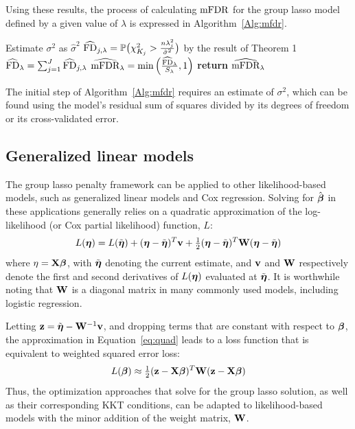 Using these results, the process of calculating $\textrm{mFDR}$ for the group lasso model defined by a given value of $\lambda$ is expressed in Algorithm~\ref{Alg:mfdr}.

\begin{algorithm*}
\caption{Calculating the mFDR upper bound}\label{Alg:mfdr}
\begin{algorithmic}[10]
\Procedure{}{}
\State Estimate $\sigma^2$ as $\hat{\sigma}^2$
\State $\widehat{\textrm{FD}}_{j, \lambda} = \mathbb{P} \big(\chi^2_{K_j} > \frac{n\lambda_j^2}{\hat{\sigma}^2}\big)$ by the result of Theorem 1
\EndFor
\State $\widehat{\textrm{FD}}_\lambda = \sum_{j=1}^{J} \widehat{\textrm{FD}}_{j, \lambda} $
\State $\widehat{\textrm{mFDR}}_\lambda = \text{min}\left(\frac{\widehat{\textrm{FD}}_\lambda}{S_\lambda}, 1 \right)$
\EndProcedure
\State \textbf{return} $\widehat{\textrm{mFDR}}_\lambda $
\end{algorithmic}
\end{algorithm*}

The initial step of Algorithm~\ref{Alg:mfdr} requires an estimate of $\sigma^2$, which can be found using the model’s residual sum of squares divided by its degrees of freedom or its cross-validated error.

\subsection{Generalized linear models}
\label{Sec:glm}

The group lasso penalty framework can be applied to other likelihood-based models, such as generalized linear models and Cox regression. Solving for $\hat{\boldsymbol{\beta}}$ in these applications generally relies on a quadratic approximation of the log-likelihood (or Cox partial likelihood) function, $L$:
\begin{equation}
\label{eq:quad}
L(\boldsymbol{\eta}) = L(\tilde{\boldsymbol{\eta}}) + (\boldsymbol{\eta} - \tilde{\boldsymbol{\eta}})^T\mathbf{v} + \tfrac{1}{2}(\boldsymbol{\eta} - \tilde{\boldsymbol{\eta}})^T\mathbf{W}(\boldsymbol{\eta} - \tilde{\boldsymbol{\eta}})
\end{equation}
where $\eta = \mathbf{X}\boldsymbol{\beta}$, with $\tilde{\boldsymbol{\eta}}$ denoting the current estimate, and $\mathbf{v}$ and $\mathbf{W}$ respectively denote the first and second derivatives of $L(\boldsymbol{\eta})$ evaluated at $\tilde{\boldsymbol{\eta}}$. It is worthwhile noting that $\mathbf{W}$ is a diagonal matrix in many commonly used models, including logistic regression.

Letting $\mathbf{z} = \tilde{\boldsymbol{\eta}} - \mathbf{W}^{-1}\mathbf{v}$, and dropping terms that are constant with respect to $\boldsymbol{\beta}$, the approximation in Equation~\ref{eq:quad} leads to a loss function that is equivalent to weighted squared error loss:
\begin{equation}
L(\boldsymbol{\beta}) \approx \tfrac{1}{2}(\mathbf{z} - \mathbf{X}\boldsymbol{\beta})^T\mathbf{W}(\mathbf{z} - \mathbf{X}\boldsymbol{\beta})
\end{equation}
Thus, the optimization approaches that solve for the group lasso solution, as well as their corresponding KKT conditions, can be adapted to likelihood-based models with the minor addition of the weight matrix, $\mathbf{W}$. 

